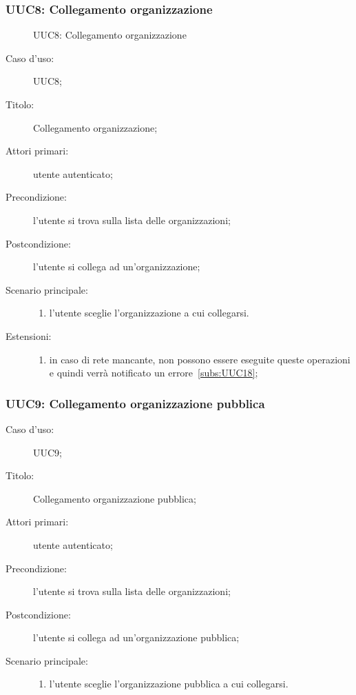 \documentclass[../../../analisi-dei-requisiti.tex]{subfiles}
\begin{document}
\subsubsection{UUC8: Collegamento organizzazione}%
\label{subs:UUC8}

\begin{figure}[H]
  \centering
  \caption{UUC8: Collegamento organizzazione}%
  \label{fig:UUC8}
\end{figure}



\begin{description}
  \item[Caso d'uso:] UUC8;
  \item[Titolo:] Collegamento organizzazione;
  \item[Attori primari:] utente autenticato;
  \item[Precondizione:] l'utente si trova sulla lista delle organizzazioni;
  \item[Postcondizione:] l'utente si collega ad un'organizzazione;
  \item[Scenario principale:]
        \begin{enumerate}
          \item l'utente sceglie l'organizzazione a cui collegarsi.
        \end{enumerate}
  \item[Estensioni:]
        \begin{enumerate}
          \item in caso di rete mancante, non possono essere eseguite queste operazioni e quindi verrà notificato un errore~\ref{subs:UUC18};
        \end{enumerate}
\end{description}

\subsubsection{UUC9: Collegamento organizzazione pubblica}%
\label{subs:UUC9}

\begin{description}
  \item[Caso d'uso:] UUC9;
  \item[Titolo:] Collegamento organizzazione pubblica;
  \item[Attori primari:] utente autenticato;
  \item[Precondizione:] l'utente si trova sulla lista delle organizzazioni;
  \item[Postcondizione:] l'utente si collega ad un'organizzazione pubblica;
  \item[Scenario principale:]
        \begin{enumerate}
          \item l'utente sceglie l'organizzazione pubblica a cui collegarsi.
        \end{enumerate}
\end{description}
\end{document}
